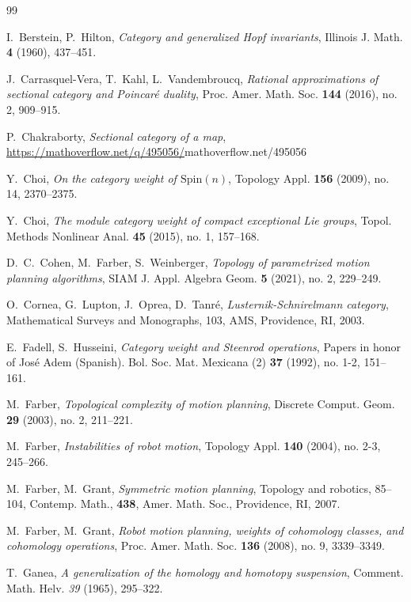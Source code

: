 \documentclass{amsart}
\theoremstyle{plain}
\theoremstyle{definition}
\begin{document}
\begin{thebibliography}{99}

 I.\ Berstein, P.\ Hilton, \emph{Category and generalized Hopf invariants}, Illinois J. Math. {\bf 4} (1960), 437--451.

 J.\ Carrasquel-Vera, T.\ Kahl, L.\ Vandembroucq, \emph{Rational approximations of sectional category and Poincar\'e duality}, Proc. Amer. Math. Soc. {\bf 144} (2016), no. 2, 909--915.

 P.\ Chakraborty, \emph{Sectional category of a map}, \url{https://mathoverflow.net/q/495056/}{mathoverflow.net/495056}

 Y.\ Choi, \emph{On the category weight of $\mathrm{Spin}(n)$}, Topology Appl. {\bf 156} (2009), no. 14, 2370--2375.

 Y.\ Choi, \emph{The module category weight of compact exceptional Lie groups}, Topol. Methods Nonlinear Anal. {\bf 45} (2015), no. 1, 157--168.

 D.\ C.\ Cohen, M.\ Farber, S.\ Weinberger, \emph{Topology of parametrized motion planning algorithms}, SIAM J. Appl. Algebra Geom. {\bf 5} (2021), no. 2, 229--249.

 O.\ Cornea, G.\ Lupton, J.\ Oprea, D.\ Tanr\' e, \emph{Lusternik-Schnirelmann category}, Mathematical Surveys and Monographs, 103, AMS, Providence, RI, 2003.

  E.\ Fadell, S.\ Husseini, \emph{Category weight and Steenrod operations}, Papers in honor of Jos\'e Adem (Spanish). Bol. Soc. Mat. Mexicana (2) {\bf 37} (1992), no. 1-2, 151--161.

 M.\ Farber, \emph{Topological complexity of motion planning}, Discrete Comput. Geom. {\bf 29} (2003), no. 2, 211--221.

 M.\ Farber, \emph{Instabilities of robot motion}, Topology Appl. {\bf 140} (2004), no. 2-3, 245--266.

 M.\ Farber, M.\ Grant, \emph{Symmetric motion planning}, Topology and robotics, 85--104, Contemp. Math., {\bf 438}, Amer. Math. Soc., Providence, RI, 2007.

 M.\ Farber, M.\ Grant, \emph{Robot motion planning, weights of cohomology classes, and cohomology operations}, Proc. Amer. Math. Soc. {\bf 136} (2008), no. 9, 3339--3349.
 
 T.\ Ganea, {\em A generalization of the homology and homotopy suspension}, Comment. Math. Helv. {\em 39} (1965), 295--322.


\end{thebibliography}
\end{document}

